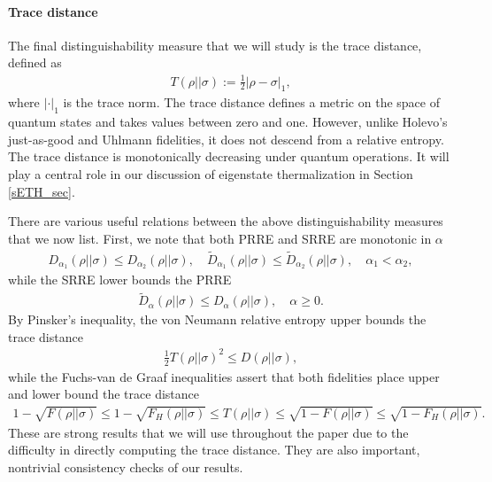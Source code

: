 \documentclass[a4paper,11pt]{article}
\begin{document}
\paragraph{Trace distance} The final distinguishability measure that we will study is the trace distance, defined as 
\begin{align}
    T(\rho || \sigma) := \frac{1}{2}\left|\rho-\sigma\right|_1,
    \label{trace_norm_def}
\end{align}
where $|\cdot|_1$ is the trace norm. The trace distance defines a metric on the space of quantum states and takes values between zero and one. However, unlike Holevo's just-as-good and Uhlmann fidelities, it does not descend from a relative entropy. The trace distance is monotonically decreasing under quantum operations. It will play a central role in our discussion of eigenstate thermalization in Section \ref{sETH_sec}.

There are various useful relations between the above distinguishability measures that we now list. First, we note that both PRRE and SRRE are monotonic in $\alpha$
\begin{align}
    {D}_{\alpha_1}(\rho || \sigma) \leq {D}_{\alpha_2}(\rho || \sigma), \quad \tilde{D}_{\alpha_1}(\rho || \sigma) \leq \tilde{D}_{\alpha_2}(\rho || \sigma), \quad \alpha_1 < \alpha_2,
    \label{RRE_ordering}
\end{align}
while the SRRE lower bounds the PRRE
\begin{align}
    \tilde{D}_{\alpha}(\rho || \sigma)\leq {D}_{\alpha}(\rho || \sigma), \quad \alpha \geq 0.
\end{align}
By Pinsker's inequality, the von Neumann relative entropy upper bounds the trace distance \cite{ohya2004quantum}
\begin{align}
      \frac{1}{2}T(\rho|| \sigma)^2 \leq D(\rho \lvert \rvert\sigma) ,
      \label{pinsker_eq}
\end{align}
while the Fuchs-van de Graaf inequalities assert that both fidelities place upper and lower bound the trace distance \cite{1997quant.ph.12042F}
\begin{align}
    1-\sqrt{F(\rho ||\sigma)}\leq 1-\sqrt{F_H(\rho ||\sigma)}\leq T(\rho ||\sigma)
 \leq \sqrt{1-{F(\rho ||\sigma)}}\leq \sqrt{1-{F_H(\rho ||\sigma)}}.
\end{align}
These are strong results that we will use throughout the paper due to the difficulty in directly computing the trace distance. They are also important, nontrivial consistency checks of our results.
\end{document}
